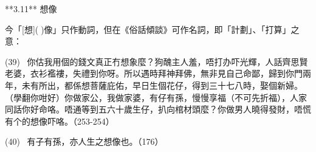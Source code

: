 **3.11** 想像

今「[想]()像」只作動詞，但在《俗話傾談》可作名詞，即「計劃」、「打算」之意：

(39)  你估我用個的錢文真正冇想象麼？狗醜主人羞，唔打办吓光輝，人話齊思賢老婆，衣衫襤褸，失禮到你呀。所以遇時拜神拜佛，無非見自己命鄙，歸到你門兩年，未有所出，都係想菩薩庇佑，早日生個花仔，得到三十七八時，娶個新婦。（學翻你咁好）你做家公，我做家婆，有仔有孫，慢慢享福（不可先折福），人家同話你好命咯。唔通等到五六十歲生仔，扒向棺材頭麼？你做男人曉得發財，唔慌有个的想像吓咯。（253-254）

(40)  有子有孫，亦人生之想像也。（176）